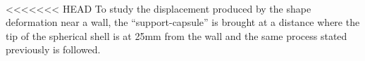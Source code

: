 \paragraph{}
<<<<<<< HEAD
To study the displacement produced by the shape deformation near a wall, the "`support-capsule"' is brought at a distance where the tip of the spherical shell is at 25mm from the wall and the same process stated previously is followed.
